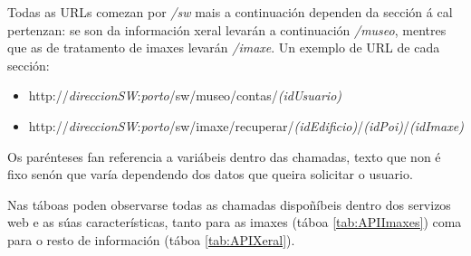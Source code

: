 Todas as URLs comezan por \emph{/sw} mais a continuación dependen da sección á cal pertenzan: se son da información xeral levarán a continuación \emph{/museo}, mentres que as de tratamento de imaxes levarán \emph{/imaxe}. Un exemplo de URL de cada sección:

\begin{itemize}
	\item http://\emph{direccionSW}:\emph{porto}/sw/museo/contas/\emph{(idUsuario)}
	\item http://\emph{direccionSW}:\emph{porto}/sw/imaxe/recuperar/\emph{(idEdificio)}/\emph{(idPoi)}/\emph{(idImaxe)}
\end{itemize}

Os parénteses fan referencia a variábeis dentro das chamadas, texto que non é fixo senón que varía dependendo dos datos que queira solicitar o usuario.

Nas táboas poden observarse todas as chamadas dispoñíbeis dentro dos servizos web e as súas características, tanto para as imaxes (táboa \ref{tab:APIImaxes}) coma para o resto de información (táboa \ref{tab:APIXeral}).

